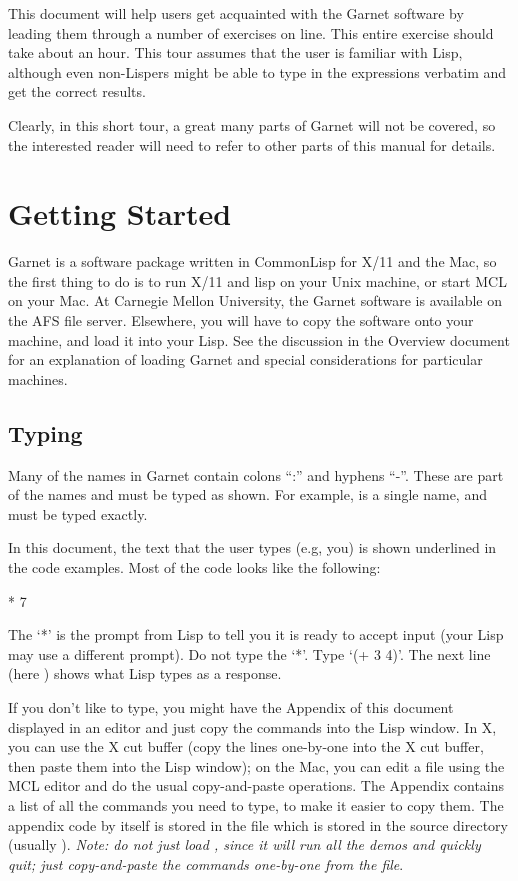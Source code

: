 This document will help users get acquainted with the Garnet software by
leading them through a number of exercises on line.  This entire exercise
should take about an hour.  This tour assumes that the user is familiar
with Lisp, although even non-Lispers might be able to type in the
expressions verbatim and get the correct results.

Clearly, in this short tour, a great many parts of Garnet will not be
covered, so the interested reader will need to refer to other parts of this
manual for details.

\chapter{Getting Started}
\label{startlisp}

Garnet is a software package written in CommonLisp for X/11 and the Mac,
so the first thing to do is to run X/11 and lisp on your Unix machine, or
start MCL on your Mac.  At Carnegie Mellon University, the Garnet
software is available on the AFS file server.  Elsewhere, you will
have to copy the software onto your machine, and load it into your
Lisp.  See the discussion in the Overview document for an explanation
of loading Garnet and special considerations for particular machines.


\section{Typing}
\label{typing}

Many of the names in Garnet contain colons ``:'' and hyphens ``-''.  These
are part of the names and must be typed as shown.  For example,
 is a single name, and must be typed exactly.

In this document, the text that the user types (e.g, you) is shown underlined
in the code examples.  Most of the code looks like the following:
\begin{programexample}
* 
7
\end{programexample}
The `*' is the prompt from Lisp to tell you it is ready to accept input
(your Lisp may use a different prompt).
Do not type the `*'.  Type `(+ 3 4)'.  The next line (here )
shows what Lisp types as a response.

If you don't like to type, you might have the Appendix of this document
displayed in an editor and just copy the commands into the Lisp
window.  In X, you can use the X cut buffer (copy the lines one-by-one
into the X cut buffer, then paste them into the Lisp window);  on the
Mac, you can edit a file using the MCL editor and do the usual
copy-and-paste operations.
The Appendix contains a list of all the commands you need to
type, to make it easier to copy them.
The appendix code by itself is stored in
the file  which is stored in the  source
directory (usually ).
{\it Note: do
not just load , since it will run all the demos and quickly
quit; just copy-and-paste the commands one-by-one from the file}.

